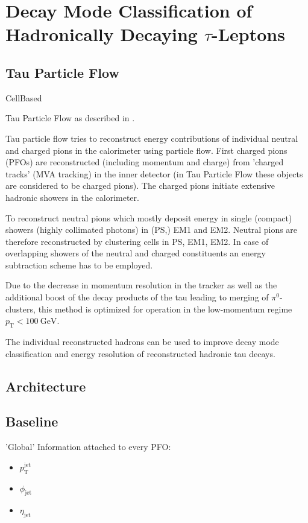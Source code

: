\chapter{Decay Mode Classification of Hadronically Decaying $\tau$-Leptons}
\label{sec:decaymode}

\section{Tau Particle Flow}
\label{sec:tau_pflow}

CellBased

Tau Particle Flow as described in \cite{atlas:taurec:decaymodes}.

Tau particle flow tries to reconstruct energy contributions of individual
neutral and charged pions in the calorimeter using particle flow. First charged
pions (PFOs) are reconstructed (including momentum and charge) from 'charged
tracks' (MVA tracking) in the inner detector (in Tau Particle Flow these objects
are considered to be charged pions). The charged pions initiate extensive
hadronic showers in the calorimeter.

To reconstruct neutral pions which mostly deposit energy in single (compact)
showers (highly collimated photons) in (PS,) EM1 and EM2. Neutral pions are
therefore reconstructed by clustering cells in PS, EM1, EM2. In case of
overlapping showers of the neutral and charged constituents an energy
subtraction scheme has to be employed.

Due to the decrease in momentum resolution in the tracker as well as the
additional boost of the decay products of the tau leading to merging of
$\pi^0$-clusters, this method is optimized for operation in the low-momentum
regime $p_\text{T} < \SI{100}{\giga\electronvolt}$.

The individual reconstructed hadrons can be used to improve decay mode
classification and energy resolution of reconstructed hadronic tau decays.


\section{Architecture}
\label{sec:pfo_architecture}


\section{Baseline}
\label{sec:pfo_baseline}

'Global' Information attached to every PFO:
\begin{itemize}
\item $p_\text{T}^\text{jet}$
\item $\phi_\text{jet}$
\item $\eta_\text{jet}$
\end{itemize}

